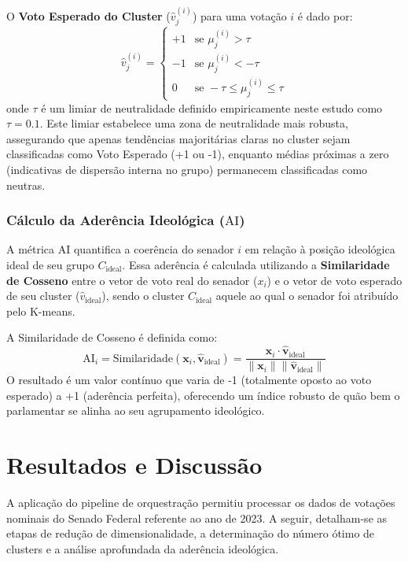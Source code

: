 \documentclass[conference]{IEEEtran}
\begin{document}
O \textbf{Voto Esperado do Cluster} ($\hat{v}_{j}^{(i)}$) para uma votação $i$ é dado por:
$$
\hat{v}_{j}^{(i)} = \begin{cases} 
+1 & \text{se } \mu_j^{(i)} > \tau \\ 
-1 & \text{se } \mu_j^{(i)} < -\tau \\ 
0 & \text{se } -\tau \le \mu_j^{(i)} \le \tau 
\end{cases}
$$
onde $\tau$ é um limiar de neutralidade definido empiricamente neste estudo como $\tau=0.1$. Este limiar estabelece uma zona de neutralidade mais robusta, assegurando que apenas tendências majoritárias claras no cluster sejam classificadas como Voto Esperado (+1 ou -1), enquanto médias próximas a zero (indicativas de dispersão interna no grupo) permanecem classificadas como neutras.

\subsubsection{Cálculo da Aderência Ideológica ($\text{AI}$)}
A métrica $\text{AI}$ quantifica a coerência do senador $i$ em relação à posição ideológica ideal de seu grupo $C_{\text{ideal}}$. Essa aderência é calculada utilizando a \textbf{Similaridade de Cosseno} entre o vetor de voto real do senador ($x_i$) e o vetor de voto esperado de seu cluster ($\hat{v}_{\text{ideal}}$), sendo o cluster $C_{\text{ideal}}$ aquele ao qual o senador foi atribuído pelo K-means.

A Similaridade de Cosseno é definida como:
$$
\text{AI}_i = \text{Similaridade}(\mathbf{x}_i, \mathbf{\hat{v}}_{\text{ideal}}) = \frac{\mathbf{x}_i \cdot \mathbf{\hat{v}}_{\text{ideal}}}{\|\mathbf{x}_i\| \|\mathbf{\hat{v}}_{\text{ideal}}\|}
$$
O resultado é um valor contínuo que varia de -1 (totalmente oposto ao voto esperado) a +1 (aderência perfeita), oferecendo um índice robusto de quão bem o parlamentar se alinha ao seu agrupamento ideológico.

\section{Resultados e Discussão}

A aplicação do pipeline de orquestração permitiu processar os dados de votações nominais do Senado Federal referente ao ano de 2023. A seguir, detalham-se as etapas de redução de dimensionalidade, a determinação do número ótimo de clusters e a análise aprofundada da aderência ideológica.
\end{document}
